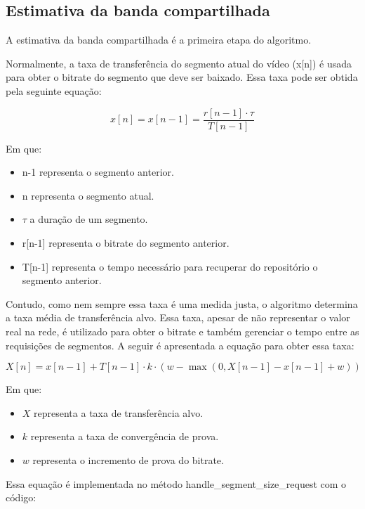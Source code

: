 \documentclass[10pt,twocolumn,letterpaper]{article}
\begin{document}
	
	\subsection{Estimativa da banda compartilhada}
	
	A estimativa da banda compartilhada é a primeira etapa do algoritmo.
	
	Normalmente, a taxa de transferência do segmento atual do vídeo (x[n]) é usada para obter o bitrate do segmento que deve ser baixado. Essa taxa pode ser obtida pela seguinte equação:
	
	\begin{equation} \label{actual_throughput}
		x[n] = x[n-1] = \frac{r[n-1] \cdot \tau}{T[n-1]} 
	\end{equation}
	
	Em que:
	\begin{itemize}
		\item n-1 representa o segmento anterior.
		\item n representa o segmento atual.
		\item $\tau$ a duração de um segmento.
		\item r[n-1] representa o bitrate do segmento anterior.
		\item T[n-1] representa o tempo necessário para recuperar do repositório o segmento anterior.
	\end{itemize}
	
	Contudo, como nem sempre essa taxa é uma medida justa, o algoritmo determina a taxa média de transferência alvo. Essa taxa, apesar de não representar o valor real na rede, é utilizado para obter o bitrate e também gerenciar o tempo entre as requisições de segmentos. A seguir é apresentada a equação para obter essa taxa:
	
	\begin{equation}\label{target_throughput}
		X[n] = x[n-1] + T[n-1] \cdot k \cdot (w - \max(0, X[n-1] - x[n-1] + w))
	\end{equation}
	
	Em que:
	\begin{itemize}
		\item $X$ representa a taxa de transferência alvo.
		\item $k$ representa a taxa de convergência de prova.
		\item $w$ representa o incremento de prova do bitrate.
	\end{itemize}
	
	Essa equação é implementada no método handle\_segment\_size\_request com o código:
	
\end{document}

